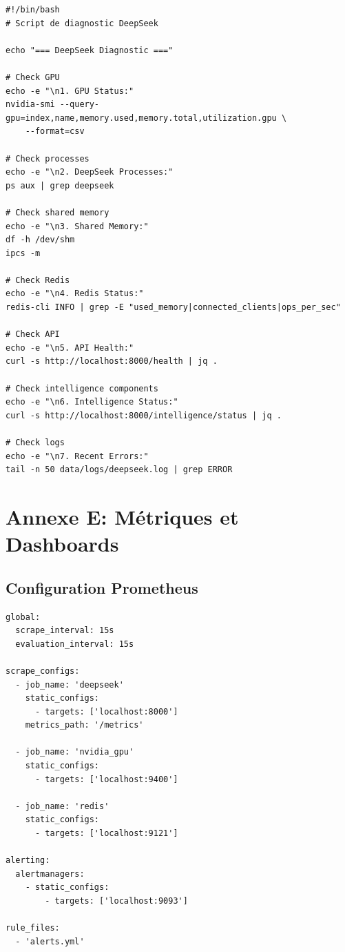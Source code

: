 \documentclass[12pt,a4paper]{article}
\begin{document}
\begin{lstlisting}[caption={diagnostic.sh}]
#!/bin/bash
# Script de diagnostic DeepSeek

echo "=== DeepSeek Diagnostic ==="

# Check GPU
echo -e "\n1. GPU Status:"
nvidia-smi --query-gpu=index,name,memory.used,memory.total,utilization.gpu \
    --format=csv

# Check processes
echo -e "\n2. DeepSeek Processes:"
ps aux | grep deepseek

# Check shared memory
echo -e "\n3. Shared Memory:"
df -h /dev/shm
ipcs -m

# Check Redis
echo -e "\n4. Redis Status:"
redis-cli INFO | grep -E "used_memory|connected_clients|ops_per_sec"

# Check API
echo -e "\n5. API Health:"
curl -s http://localhost:8000/health | jq .

# Check intelligence components
echo -e "\n6. Intelligence Status:"
curl -s http://localhost:8000/intelligence/status | jq .

# Check logs
echo -e "\n7. Recent Errors:"
tail -n 50 data/logs/deepseek.log | grep ERROR
\end{lstlisting}

\section{Annexe E: Métriques et Dashboards}

\subsection{Configuration Prometheus}

\begin{lstlisting}[caption={monitoring/prometheus.yml}]
global:
  scrape_interval: 15s
  evaluation_interval: 15s

scrape_configs:
  - job_name: 'deepseek'
    static_configs:
      - targets: ['localhost:8000']
    metrics_path: '/metrics'
    
  - job_name: 'nvidia_gpu'
    static_configs:
      - targets: ['localhost:9400']
      
  - job_name: 'redis'
    static_configs:
      - targets: ['localhost:9121']

alerting:
  alertmanagers:
    - static_configs:
        - targets: ['localhost:9093']

rule_files:
  - 'alerts.yml'
\end{lstlisting}
\end{document}
